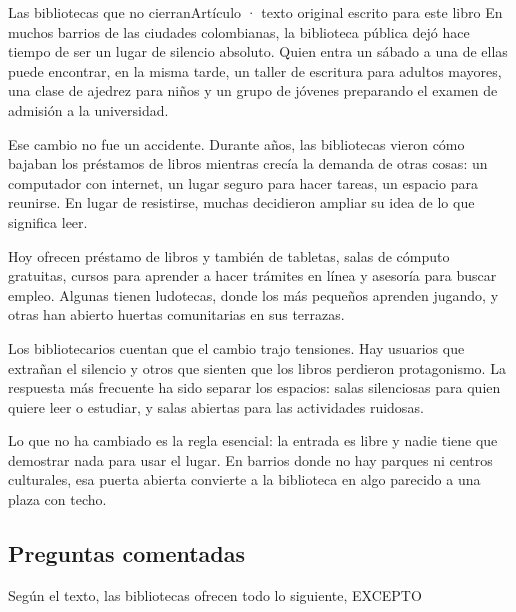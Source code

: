 \begin{texto}{Las bibliotecas que no cierran}{Artículo · texto original escrito para este libro}
\pa En muchos barrios de las ciudades colombianas, la biblioteca pública dejó hace tiempo de ser un lugar de silencio
absoluto. Quien entra un sábado a una de ellas puede encontrar, en la misma tarde, un taller de escritura para adultos
mayores, una clase de ajedrez para niños y un grupo de jóvenes preparando el examen de admisión a la universidad.

\pa Ese cambio no fue un accidente. Durante años, las bibliotecas vieron cómo bajaban los préstamos de libros mientras
crecía la demanda de otras cosas: un computador con internet, un lugar seguro para hacer tareas, un espacio para reunirse.
En lugar de resistirse, muchas decidieron ampliar su idea de lo que significa leer.

\pa Hoy ofrecen préstamo de libros y también de tabletas, salas de cómputo gratuitas, cursos para aprender a hacer trámites
en línea y asesoría para buscar empleo. Algunas tienen ludotecas, donde los más pequeños aprenden jugando, y otras han
abierto huertas comunitarias en sus terrazas.

\pa Los bibliotecarios cuentan que el cambio trajo tensiones. Hay usuarios que extrañan el silencio y otros que sienten que
los libros perdieron protagonismo. La respuesta más frecuente ha sido separar los espacios: salas silenciosas para quien
quiere leer o estudiar, y salas abiertas para las actividades ruidosas.

\pa Lo que no ha cambiado es la regla esencial: la entrada es libre y nadie tiene que demostrar nada para usar el lugar. En
barrios donde no hay parques ni centros culturales, esa puerta abierta convierte a la biblioteca en algo parecido a una
plaza con techo.
\end{texto}

\subsection{Preguntas comentadas}
\begin{comentada}{Según el texto, las bibliotecas ofrecen todo lo siguiente, EXCEPTO}
\end{comentada}

